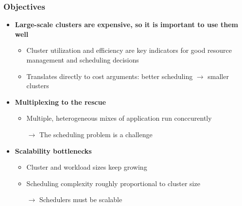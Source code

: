 \begin{frame}\frametitle{Objectives}
\begin{itemize}
	\item {\bf Large-scale clusters are expensive, so it is important to use them well}
	\begin{itemize}
		\item Cluster utilization and efficiency are key indicators for good resource management and scheduling decisions
		\item Translates directly to cost arguments: better scheduling $\to$ smaller clusters
	\end{itemize}

\vspace{10pt}

	\item {\bf Multiplexing to the rescue}
	\begin{itemize}
		\item Multiple, heterogeneous mixes of application run conccurently
		\item[$\to$] The scheduling problem is a challenge
	\end{itemize}

\vspace{10pt}

	\item {\bf Scalability bottlenecks}
	\begin{itemize}
		\item Cluster and workload sizes keep growing
		\item Scheduling complexity roughly proportional to cluster size
		\item[$\to$] Schedulers must be scalable
	\end{itemize}
\end{itemize}
\end{frame}

